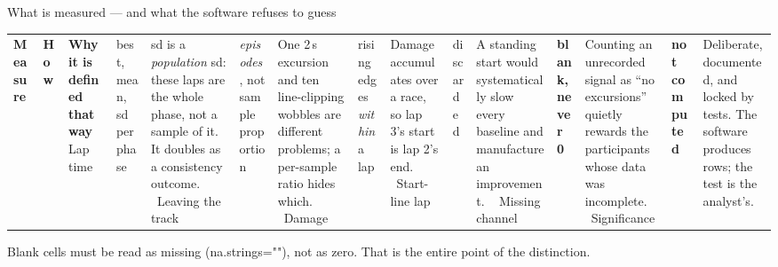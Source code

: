 \documentclass[aspectratio=169,10pt]{beamer}
\newcommand{\kw}[1]{\textcolor{cblue}{\textbf{#1}}}
\newcommand{\code}[1]{{\ttfamily\small #1}}
\begin{document}
\begin{frame}{What is measured --- and what the software refuses to guess}
  \vspace{-0.2em}
  \begin{center}\footnotesize
  \begin{tabular}{@{}L{3.3cm}L{5.0cm}L{5.6cm}@{}}
    \toprule
    \textbf{Measure} & \textbf{How} & \textbf{Why it is defined that way} \
    \midrule
    Lap time & \code{best}, \code{mean}, \code{sd} per phase &
      \code{sd} is a \emph{population} sd: these laps are the whole phase, not a
      sample of it. It doubles as a consistency outcome. \
    Leaving the track & \emph{episodes}, not sample proportion &
      One 2\,s excursion and ten line-clipping wobbles are different problems; a
      per-sample ratio hides which. \
    Damage & rising edges \emph{within} a lap &
      Damage accumulates over a race, so lap 3's start is lap 2's end. \
    Start-line lap & discarded &
      A standing start would systematically slow every baseline and manufacture an
      improvement. \
    \midrule
    Missing channel & \kw{blank, never 0} &
      Counting an unrecorded signal as ``no excursions'' quietly rewards the
      participants whose data was incomplete. \
    Significance & \kw{not computed} &
      Deliberate, documented, and locked by tests. The software produces rows; the
      test is the analyst's. \
    \bottomrule
  \end{tabular}
  \end{center}
  \vspace{0.2em}
  {\footnotesize\color{cgray} Blank cells must be read as missing (\code{na.strings=""}),
  not as zero. That is the entire point of the distinction.}
\end{frame}
\end{document}
